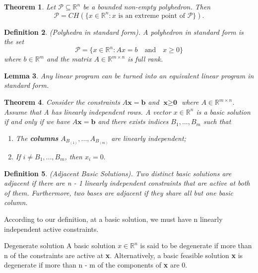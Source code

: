 \documentclass[twoside]{article}
\newcounter{lecnum}
\newtheorem{theorem}{Theorem}[lecnum]
\newtheorem{lemma}[theorem]{Lemma}
\newtheorem{definition}[theorem]{Definition}
\begin{document}
\begin{theorem}Let $\mathcal{P} \subseteq \mathbb{R}^n$ be a bounded non-empty polyhedron. Then 
$$
\mathcal{P} = CH(\{x \in \mathbb{R}^n: x \text{ is an extreme point of } \mathcal{P}\}).
$$
\end{theorem}

\begin{definition}(Polyhedra in standard form). A polyhedron in standard form is the set 
$$
\mathcal{P} = \{x \in \mathbb{R}^n: Ax = b \quad \text{and} \quad x \geq 0\}
$$
where $b \in \mathbb{R}^m$ and the matrix $A \in \mathbb{R}^{m \times n}$ is full rank.
\end{definition}

\begin{lemma}Any linear program can be turned into an equivalent linear program in standard form.
\end{lemma}

\begin{theorem}Consider the constraints $A\textbf{x} = \textbf{b}$ and $\textbf{x} \geq \textbf{0}$ where $A \in \mathbb{R}^{m \times n}$. Assume that A has linearly independent rows. A vector $x \in \mathbb{R}^n$ is a basic solution if and only if we have $A\textbf{x} = \textbf{b}$ and there exists indices $B_1,...,B_m$ such that 
\begin{enumerate}
\item The \textbf{columns} $A_{B_{(1)}}, ..., A_{B_{(m)}}$ are linearly independent;
\item If $i \neq B_1,...,B_m$, then $x_i = 0.$
\end{enumerate} 
\end{theorem}

\begin{definition}(Adjacent Basic Solutions). Two distinct basic solutions are adjacent if there are n - 1 linearly independent constraints that are active at both of them. Furthermore, two bases are adjacent if they share all but one basic column.
\end{definition}

According to our definition, at a basic solution, we must have n linearly independent active constraints. 

\begin{definition_exam}{Degenerate solution}{} A basic solution $x \in \mathbb{R}^n$ is said to be degenerate if more than n of the constraints are active at \textbf{x}. Alternatively, a basic feasible solution \textbf{x} is degenerate if more than n - m of the components of \textbf{x} are 0.
\end{definition_exam}
\end{document}

